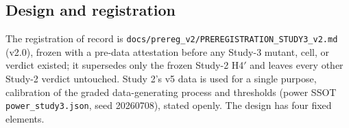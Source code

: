 \documentclass[manuscript,screen,review]{acmart}
\begin{document}
\subsection{Design and registration}\label{study3-design}

The registration of record is
\texttt{docs/prereg\_v2/PREREGISTRATION\_STUDY3\_v2.md} (v2.0), frozen with a
pre-data attestation before any Study-3 mutant, cell, or verdict existed; it
supersedes only the frozen Study-2 H4\('\) and leaves every other Study-2
verdict untouched. Study 2's v5 data is used for a single purpose, calibration
of the graded data-generating process and thresholds (power SSOT
\texttt{power\_study3.json}, seed 20260708), stated openly. The design has four
fixed elements.

\begin{itemize}


\end{itemize}
\end{document}
